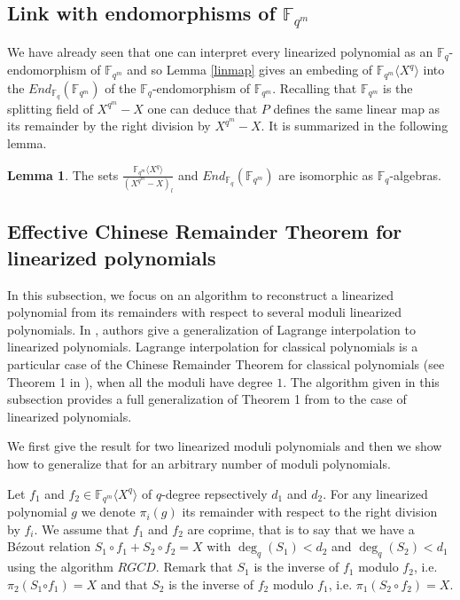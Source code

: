 \documentclass{article}
\newcommand{\tmop}[1]{#1}          %
\newcommand{\Fq}{\mathbb{F}_q}
\newcommand{\QP}{\mathbb{F}_{q^m} \langle X^q \rangle}
\theoremstyle{definition}
\newtheorem{lemma}[theorem]{Lemma}
\begin{document}
\subsection{Link with endomorphisms of $\mathbb{F}_{q^m}$}\label{endo}

We have already seen that one can interpret every linearized polynomial as an
$\mathbb{F}_q$-endomorphism of $\mathbb{F}_{q^m}$ and so Lemma \ref{linmap}
gives an embeding of $\mathbb{F}_{q^m} \langle X^q \rangle$ into the
$\tmop{End}_{\mathbb{F}_q} (\mathbb{F}_{q^m})$ of the
$\mathbb{F}_q$-endomorphism of $\mathbb{F}_{q^m}$. Recalling that
$\mathbb{F}_{q^m}$ is the splitting field of $X^{q^m} - X$ one can deduce
that $P$ defines the same linear map as its remainder by the right division by
$X^{q^m} - X$. It is summarized in the following lemma.

\begin{lemma} \label{lemendo}
      The sets $\frac{\QP}{\left( X^{q^m}-X\right)_l}$ and $\tmop{End}_{\mathbb{F}_q} (\mathbb{F}_{q^m})$ are isomorphic as $\Fq$-algebras.
\end{lemma}

\subsection{Effective Chinese Remainder Theorem for linearized
      polynomials}\label{secECRT}

In this subsection, we focus on an algorithm to reconstruct a linearized
polynomial from its remainders with respect to several moduli linearized
polynomials. In \cite{R1reviewer1}, authors give a generalization of
Lagrange interpolation to linearized polynomials. Lagrange interpolation for classical
polynomials is a particular case of the Chinese Remainder Theorem for classical polynomials (see Theorem 1 in \cite{yu_polynomial_2012}), when all the moduli have degree $1$.
The algorithm given in this subsection provides a full generalization of Theorem 1 from  \cite{yu_polynomial_2012} to the case of linearized polynomials.  \color{black}

We first give the result for two linearized moduli polynomials
and then we show how to generalize that for an arbitrary number of moduli
polynomials.

Let $f_1$ and $f_2 \in \mathbb{F}_{q^m} \langle X^q \rangle$ of $q$-degree
repsectively $d_1$ and $d_2$. For any linearized polynomial $g$ we
denote $\pi_i (g)$ its remainder with respect to the right division by $f_i$. We
assume that $f_1$ and $f_2$ are coprime, that is to say that we have a
B{\'e}zout relation $S_1 \circ f_1 + S_2 \circ f_2 = X$ with $\deg_q
      (S_1) < d_2$ and $\deg_q (S_2) < d_1$ using the algorithm
$\tmop{RGCD}$. Remark that $S_1$ is the inverse of $f_1$ modulo $f_2$, i.e.
$\pi_2 \left( S_1 {\circ f_1}  \right) = X$ and that $S_2$ is the inverse of
$f_2$ modulo $f_1$, i.e. $\pi_1 (S_2 \circ f_2) = X$.
\end{document}
